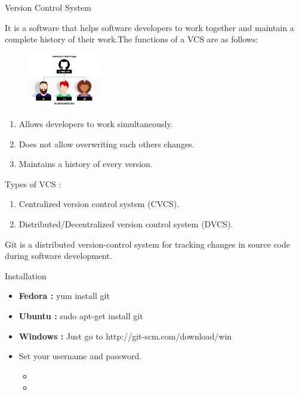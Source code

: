 \documentclass[xcolor=x11names,compress]{beamer}
\renewcommand{\(}{\begin{columns}}
\renewcommand{\)}{\end{columns}}
\newcommand{\<}[1]{\begin{column}{#1}}
\renewcommand{\>}{\end{column}}
\begin{document}

\begin{frame}{Version Control System}
	
	It is a software that helps software developers to work together and maintain a complete history of their work.The functions of a VCS are as follows: 
\begin{figure}
		\includegraphics[width=0.28\textwidth]{s13.jpg}
\end{figure}
	\begin{enumerate}
	\item Allows developers to work simultaneously.
	\item Does not allow overwriting each others changes.
	\item Maintains a history of every version.
	\end{enumerate}
	
	Types of VCS : 
	\begin{enumerate}
	\item Centralized version control system (CVCS).
	\item Distributed/Decentralized version control system (DVCS).
	\end{enumerate}
	Git is a distributed version-control system for tracking changes in source code during software development.
\end{frame}
%		
\begin{frame}{Installation}
	\begin{itemize}
		\item 	\textbf{Fedora :} yum install git 
		\item \textbf{Ubuntu :} sudo apt-get install git
		\item \textbf{Windows :} Just go to http://git-scm.com/download/win
		\item Set your username and password.
		\begin{itemize}
		\item {}
		\item {}
	\end{itemize}
	\end{itemize}
\end{frame}
\end{document}
